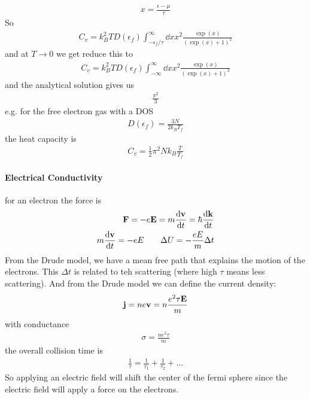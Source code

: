 \documentclass[../main.tex]{subfiles}
\begin{document}
\begin{align*}
    x = \frac{\epsilon - \mu}{\tau}
\end{align*}
So
\begin{align*}
    C_v = k_B^2 T D(\epsilon_f) \int_{-\epsilon_f/\tau}^\infty \dd{x} x^2 \frac{\exp(x)}{(\exp(x) + 1)^2}
\end{align*}
and at $T \to 0$ we get reduce this to
\begin{align*}
    C_v = k_B^2 T D(\epsilon_f) \int_{-\infty}^\infty \dd{x} x^2 \frac{\exp(x)}{(\exp(x) + 1)^2}
\end{align*}
and the analytical solution gives us
\begin{align*}
    \frac{\pi^2}{3}
\end{align*}
e.g. for the free electron gas with a DOS
\begin{align*}
    D(\epsilon_f) = \frac{3N}{2k_B T_f} 
\end{align*}
the heat capacity is
\begin{align*}
    C_v = \frac{1}{2} \pi^2 N k_B \frac{T}{T_f}
\end{align*}

\paragraph*{Electrical Conductivity}
for an electron the force is
\begin{align*}
    \vb{F} = -e \vb{E} = m \dv{\vb{v}}{t} = \hbar \dv{\vb{k}}{t} \\
    m \dv{\vb{v}}{t} = -e E \qquad \Delta U = -\frac{eE}{m} \Delta t
\end{align*}
From the Drude model, we have a mean free path that explains the motion of the electrons. This
$\Delta t$ is related to teh scattering (where high $\tau$ means less scattering). And from the
Drude model we can define the current density:
\begin{align*}
    \vb{j} = n e \vb{v} = n \frac{e^2 \tau \vb{E}}{m}
\end{align*}
with conductance
\begin{align*}
    \sigma = \frac{ne^2 \tau}{m}
\end{align*}
the overall collision time is 
\begin{align*}
    \frac{1}{\tau} = \frac{1}{\tau_1} + \frac{1}{\tau_2} + \dots
\end{align*}
So applying an electric field will shift the center of the fermi sphere since the electric field 
will apply a force on the electrons. 
\end{document}
